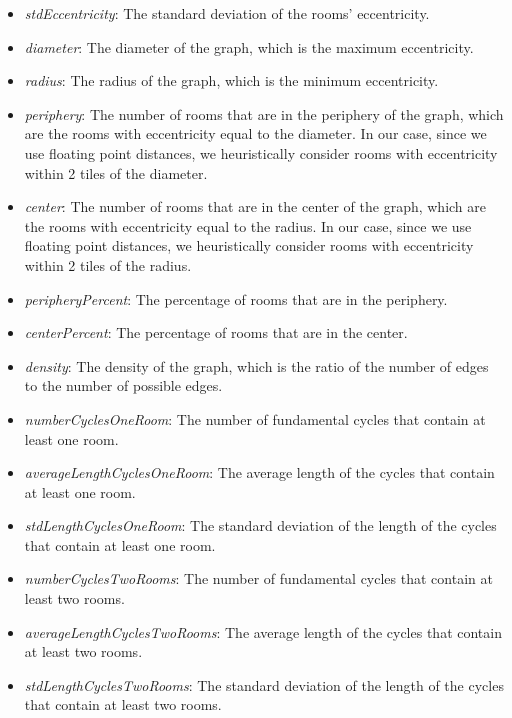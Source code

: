 \documentclass{Configuration_Files/PoliMi3i_thesis}
\begin{document}
\begin{itemize}
    \item \textit{stdEccentricity}: The standard deviation of the rooms' eccentricity.
    \item \textit{diameter}: The diameter of the graph, which is the maximum eccentricity.
    \item \textit{radius}: The radius of the graph, which is the minimum eccentricity.
    \item \textit{periphery}: The number of rooms that are in the periphery of the graph, which are the rooms with eccentricity equal to the diameter. In our case, since we use floating point distances, we heuristically consider rooms with eccentricity within 2 tiles of the diameter.
    \item \textit{center}: The number of rooms that are in the center of the graph, which are the rooms with eccentricity equal to the radius. In our case, since we use floating point distances, we heuristically consider rooms with eccentricity within 2 tiles of the radius.
    \item \textit{peripheryPercent}: The percentage of rooms that are in the periphery.
    \item \textit{centerPercent}: The percentage of rooms that are in the center.
    \item \textit{density}: The density of the graph, which is the ratio of the number of edges to the number of possible edges.
    \item \textit{numberCyclesOneRoom}: The number of fundamental cycles that contain at least one room.
    \item \textit{averageLengthCyclesOneRoom}: The average length of the cycles that contain at least one room.
    \item \textit{stdLengthCyclesOneRoom}: The standard deviation of the length of the cycles that contain at least one room.
    \item \textit{numberCyclesTwoRooms}: The number of fundamental cycles that contain at least two rooms.
    \item \textit{averageLengthCyclesTwoRooms}:  The average length of the cycles that contain at least two rooms.
    \item \textit{stdLengthCyclesTwoRooms}: The standard deviation of the length of the cycles that contain at least two rooms.
\end{itemize}
\end{document}
